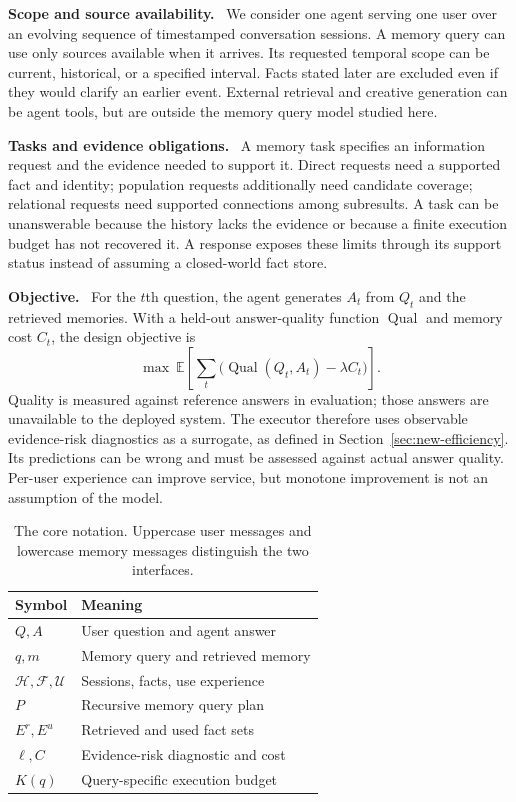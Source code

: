 \documentclass[10pt,twocolumn]{article}
\newcommand{\Hh}{\mathcal{H}}
\newcommand{\Ff}{\mathcal{F}}
\newcommand{\Uu}{\mathcal{U}}
\newcommand{\runin}[1]{\smallskip\noindent\textbf{#1.}\ }
\begin{document}
\runin{Scope and source availability}
We consider one agent serving one user over an evolving sequence of
timestamped conversation sessions. A memory query can use only sources
available when it arrives. Its requested temporal scope can be current,
historical, or a specified interval. Facts stated later are excluded
even if they would clarify an earlier event. External retrieval and
creative generation can be agent tools, but are outside the memory
query model studied here.

\runin{Tasks and evidence obligations}
A memory task specifies an information request and the evidence needed
to support it. Direct requests need a supported fact and identity;
population requests additionally need candidate coverage; relational
requests need supported connections among subresults. A task can be
unanswerable because the history lacks the evidence or because a finite
execution budget has not recovered it. A response exposes these limits
through its support status instead of assuming a closed-world fact store.

\runin{Objective}
For the $t$th question, the agent generates $A_t$ from $Q_t$ and the
retrieved memories. With a held-out answer-quality function
$\operatorname{Qual}$ and memory cost $C_t$, the design objective is
\begin{equation}
\label{eq:new-objective}
\max\ \mathbb{E}\!\left[\sum_t
       \bigl(\operatorname{Qual}(Q_t,A_t)-\lambda C_t\bigr)\right].
\end{equation}
Quality is measured against reference answers in evaluation; those
answers are unavailable to the deployed system. The executor therefore
uses observable evidence-risk diagnostics as a surrogate, as defined
in Section~\ref{sec:new-efficiency}. Its predictions can be wrong and
must be assessed against actual answer quality. Per-user experience
can improve service, but monotone improvement is not an assumption of
the model.

\begin{table}[t]
\centering\small
\caption{The core notation. Uppercase user messages and lowercase memory
messages distinguish the two interfaces.}
\label{tab:new-notation}
\begin{tabular}{@{}ll@{}}
\toprule
Symbol & Meaning\\
\midrule
$Q,A$ & User question and agent answer\\
$q,m$ & Memory query and retrieved memory\\
$\Hh,\Ff,\Uu$ & Sessions, facts, use experience\\
$P$ & Recursive memory query plan\\
$E^r,E^u$ & Retrieved and used fact sets\\
$\ell,C$ & Evidence-risk diagnostic and cost\\
$K(q)$ & Query-specific execution budget\\
\bottomrule
\end{tabular}
\end{table}
\end{document}
